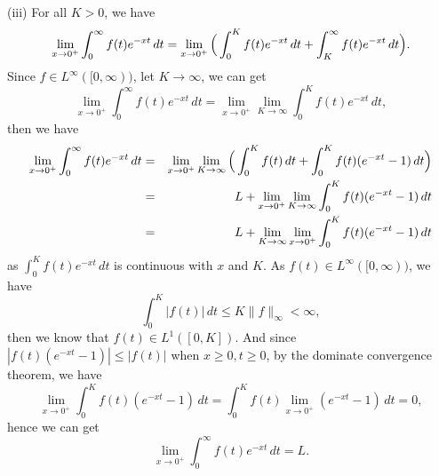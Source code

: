 \documentclass[12pt,a4paper]{ctexart}
\begin{document}
(iii) For all $K > 0$, we have
\begin{equation*}
    \lim_{x \to 0^{+}} \int_{0}^{ \infty} f(t) e^{- x t} \, d t =  \lim_{x \to 0^{+}} \Big{(} \int_{0}^{K} f(t) e^{- x t} \, d t + \int_{K}^{\infty} f(t) e^{- x t} \, d t \Big{)}.
\end{equation*}
Since $f \in L^{\infty} ([0, \infty))$, let $K \to \infty$, we can get 
\begin{equation*}
    \lim_{x \to 0^{+}} \int_{0}^{ \infty} f(t) e^{- x t} \, d t  =  \lim_{x \to 0^{+}} \lim_{K \to \infty} \int_{0}^{K} f(t) e^{- x t} \, d t, 
\end{equation*}
then we have
\begin{eqnarray*}
\lim_{x \to 0^{+}} \int_{0}^{ \infty} f(t) e^{- x t} \, d t 
& = & \lim_{x \to 0^{+}} \lim_{K \to \infty} \Big{(} \int_{0}^{K} f(t) \, d t + \int_{0}^{K} f(t) ( e^{- x t} - 1) \, d t \Big{)} \\
& = & L + \lim_{x \to 0^{+}} \lim_{K \to \infty}  \int_{0}^{K} f(t) ( e^{- x t} - 1) \, d t \\
& = & L + \lim_{K \to \infty} \lim_{x \to 0^{+}} \int_{0}^{K} f(t) ( e^{- x t} - 1) \, d t
\end{eqnarray*}
as $\int_{0}^{K} f(t) e^{- x t} \, d t$ is continuous with $x$ and $K$. As $f(t) \in L^{\infty}([0, \infty))$, we have
\begin{equation*}
    \int_{0}^{K} |f(t)| \, d t \leq K \|f\|_{\infty} < \infty,
\end{equation*}
then we know that $f(t) \in L^{1}([0, K])$. And since $|f(t) ( e^{- x t} - 1)| \leq |f(t)|$ when $x \geq 0, t \geq 0$, by the dominate convergence theorem, we have
\begin{equation*}
    \lim_{x \to 0^{+}} \int_{0}^{K} f(t) (e^{-x t} - 1) \, d t = \int_{0}^{K} f(t) \lim_{x \to 0^{+}} (e^{-x t} - 1) \, d t = 0,
\end{equation*}
hence we can get
\begin{equation*}
    \lim_{x \to 0^{+}} \int_{0}^{ \infty} f(t) e^{- x t} \, d t = L.
\end{equation*}
\end{document}
